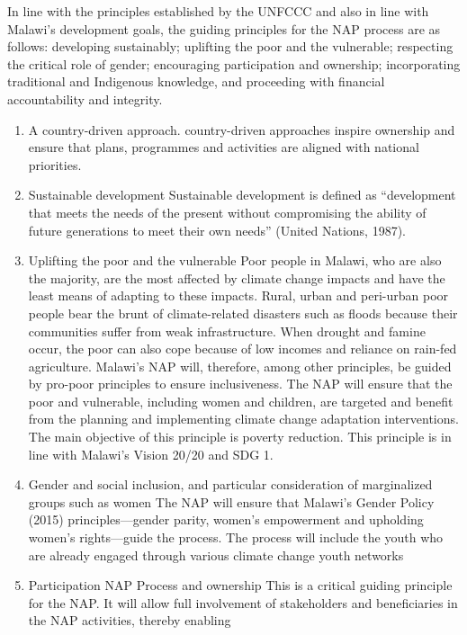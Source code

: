 \documentclass[
]{book}
\begin{document}
In line with the principles established by the UNFCCC and also in line with Malawi's development goals, the guiding principles for the NAP process are as follows:
developing sustainably; uplifting the poor and the vulnerable; respecting the critical role of gender; encouraging participation and ownership; incorporating
traditional and Indigenous knowledge, and proceeding with financial accountability and integrity.

\begin{enumerate}
\def\labelenumi{\alph{enumi}.}
\item
  A country-driven approach.
  country-driven approaches inspire ownership and ensure that plans, programmes and activities are aligned with national priorities.
\item
  Sustainable development
  Sustainable development is defined as ``development that meets the needs of the present without compromising the ability of future generations to meet their own
  needs'' (United Nations, 1987).
\item
  Uplifting the poor and the vulnerable
  Poor people in Malawi, who are also the majority, are the most affected by climate change impacts and have the least means of adapting to these impacts. Rural,
  urban and peri-urban poor people bear the brunt of climate-related disasters such as floods because their communities suffer from weak infrastructure. When drought
  and famine occur, the poor can also cope because of low incomes and reliance on rain-fed agriculture. Malawi's NAP will, therefore, among other principles, be
  guided by pro-poor principles to ensure inclusiveness. The NAP will ensure that the poor and vulnerable, including women and children, are targeted and benefit from
  the planning and implementing climate change adaptation interventions. The main objective of this principle is poverty reduction. This principle is in line with
  Malawi's Vision 20/20 and SDG 1.
\item
  Gender and social inclusion, and particular consideration of marginalized groups such as women
  The NAP will ensure that Malawi's Gender Policy (2015) principles---gender parity, women's empowerment and upholding women's rights---guide the process. The process will include the youth who are already engaged through various climate change youth networks
\item
  Participation NAP Process and ownership
  This is a critical guiding principle for the NAP. It will allow full involvement of stakeholders and beneficiaries in the NAP activities, thereby enabling

\end{enumerate}
\end{document}
